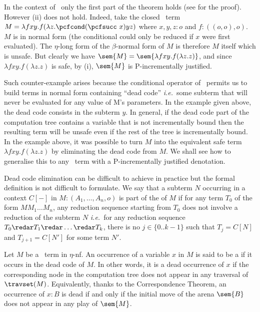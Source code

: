 In the context of \pcf\, only the first part of the theorem holds (see \cite{blumtransfer} for the proof). However (ii) does not hold. Indeed, take the closed \pcf\ term $M = \lambda f x y. f (\lambda z. \pcfcond (\pcfsucc\ x) y z )$ where $x,y,z:o$ and $f:((o,o),o)$. $M$ is in normal form (the conditional  could  only be reduced if $x$ were first evaluated). The $\eta$-long form of the $\beta$-normal form of $M$ is therefore $M$ itself which is unsafe.
But clearly we have $\sem{M} = \sem{\lambda f x y. f (\lambda z. z)}$, and since  $\lambda f x y. f (\lambda z. z)$ is safe, by (i), $\sem{M}$ is P-incrementally justified.

Such counter-example arises because the conditional operator of \pcf\ permits us to build terms in normal form containing ``dead code'' {\it i.e.}~some subterm that will never be evaluated for any value of M's parameters. In the example given above, the dead code consists in the subterm $y$. In general, if the dead code part of the computation tree contains a variable that is not incrementally bound then the resulting term will be unsafe even if the rest of the tree is incrementally bound.
In the example above, it was possible to turn $M$ into the equivalent safe term $\lambda f x y. f (\lambda z. z)$ by eliminating the dead code from $M$.
We shall see how to generalise this to any \pcf\ term with a P-incrementally justified denotation.

Dead code elimination can be difficult to achieve in practice but the formal definition is not difficult to formulate. We say that a subterm $N$ occurring
in a context $C[-]$ in $M : (A_1, \ldots, A_n,o)$ is part of the  of $M$ if for any term $T_0$ of the form $M M_1 \ldots M_n$,
any reduction sequence starting from $T_0$ does not involve a reduction of the subterm $N$ {\it i.e.}~for any reduction sequence $T_0 \redar T_1 \redar \ldots \redar T_k$, there is no $j\in \{0.. k-1\}$ such that $T_j = C[N]$ and $T_{j+1} = C[N']$ for some term $N'$.
 

Let $M$  be a \pcf\ term in $\eta$-nf.
An occurrence of a variable $x$ in $M$ is said to be a 
if it occurs in the dead code of $M$. In other words, it is a
dead occurrence of $x$ if the corresponding node in the computation tree does not appear in any traversal of $\travset(M)$. Equivalently, thanks to the Correspondence Theorem, an occurrence of $x:B$ is dead if and only if the initial move
of the arena $\sem{B}$ does not appear in any play of $\sem{M}$.


